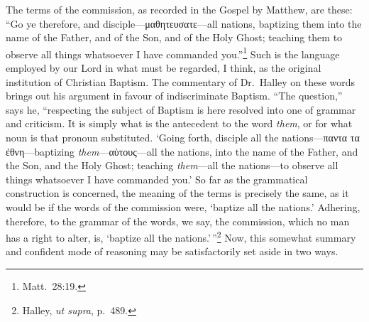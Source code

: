 \documentclass[
]{book}
\begin{document}
The terms of the commission, as recorded in the Gospel by Matthew, are these: ``Go ye therefore, and disciple---\foreignlanguage{greek}{μαθητευσατε}---all nations, baptizing them into the name of the Father, and of the Son, and of the Holy Ghost; teaching them to observe all things whatsoever I have commanded you.''\footnote{Matt.~28:19.} Such is the language employed by our Lord in what must be regarded, I think, as the original institution of Christian Baptism. The commentary of Dr.~Halley on these words brings out his argument in favour of indiscriminate Baptism. ``The question,'' says he, ``respecting the subject of Baptism is here resolved into one of grammar and criticism. It is simply what is the antecedent to the word \emph{them}, or for what noun is that pronoun substituted. `Going forth, disciple all the nations---\foreignlanguage{greek}{παντα τα ἐθνη}---baptizing \emph{them}---\foreignlanguage{greek}{αὐτους}---all the nations, into the name of the Father, and the Son, and the Holy Ghost; teaching \emph{them}---all the nations---to observe all things whatsoever I have commanded you.' So far as the grammatical construction is concerned, the meaning of the terms is precisely the same, as it would be if the words of the commission were, `baptize all the nations.' Adhering, therefore, to the grammar of the words, we say, the commission, which no man has a right to alter, is, `baptize all the nations.'\,''\footnote{Halley, \emph{ut supra}, p.~489.} Now, this somewhat summary and confident mode of reasoning may be satisfactorily set aside in two ways.
\end{document}
